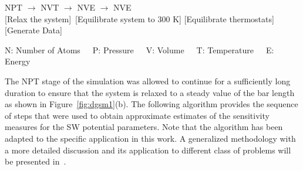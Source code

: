 \begin{center}

NPT \hspace{5mm} $\rightarrow$ \hspace{5mm} NVT \hspace{5mm} $\rightarrow$ \hspace{5mm} NVE \hspace{5mm}
$\rightarrow$ \hspace{5mm} NVE
\\ \vspace{1mm}
\tiny [Relax the system]~[Equilibrate system to 300 K] \hspace{1mm} [Equilibrate thermostats] \hspace{4mm}
 [Generate Data]
\\ \vspace{1mm}

\tiny{N: Number of Atoms~~~P: Pressure~~~V: Volume~~~T: Temperature~~~E: Energy}
\end{center}

\noindent The NPT stage of the simulation was allowed to continue for a sufficiently long duration to ensure
that the system is relaxed to a steady value of the bar length as shown in Figure~\ref{fig:dgsm1}(b).
The following algorithm provides the sequence of steps that were used to obtain approximate estimates of the
sensitivity measures for the SW potential parameters. Note that the algorithm has been adapted to the 
specific application in this work. A generalized methodology with a more detailed discussion and its application
to different class of problems will be presented in~\cite{Vohra:2018}.

\bigskip

